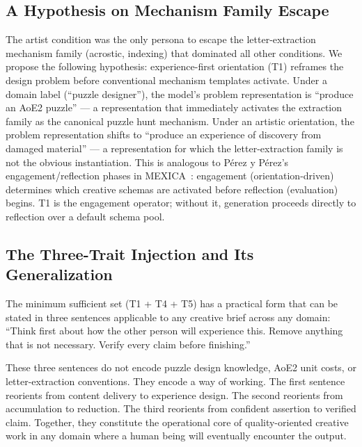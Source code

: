\subsection{A Hypothesis on Mechanism Family Escape}

The artist condition was the only persona to escape the letter-extraction mechanism family (acrostic, indexing) that dominated all other conditions. We propose the following hypothesis: experience-first orientation (T1) reframes the design problem before conventional mechanism templates activate. Under a domain label (``puzzle designer''), the model's problem representation is ``produce an AoE2 puzzle'' --- a representation that immediately activates the extraction family as the canonical puzzle hunt mechanism. Under an artistic orientation, the problem representation shifts to ``produce an experience of discovery from damaged material'' --- a representation for which the letter-extraction family is not the obvious instantiation. This is analogous to P\'erez y P\'erez's engagement/reflection phases in MEXICA~\cite{perezyperez2001mexica}: engagement (orientation-driven) determines which creative schemas are activated before reflection (evaluation) begins. T1 is the engagement operator; without it, generation proceeds directly to reflection over a default schema pool.

\subsection{The Three-Trait Injection and Its Generalization}

The minimum sufficient set (T1 + T4 + T5) has a practical form that can be stated in three sentences applicable to any creative brief across any domain: ``Think first about how the other person will experience this. Remove anything that is not necessary. Verify every claim before finishing.''

These three sentences do not encode puzzle design knowledge, AoE2 unit costs, or letter-extraction conventions. They encode a way of working. The first sentence reorients from content delivery to experience design. The second reorients from accumulation to reduction. The third reorients from confident assertion to verified claim. Together, they constitute the operational core of quality-oriented creative work in any domain where a human being will eventually encounter the output.

